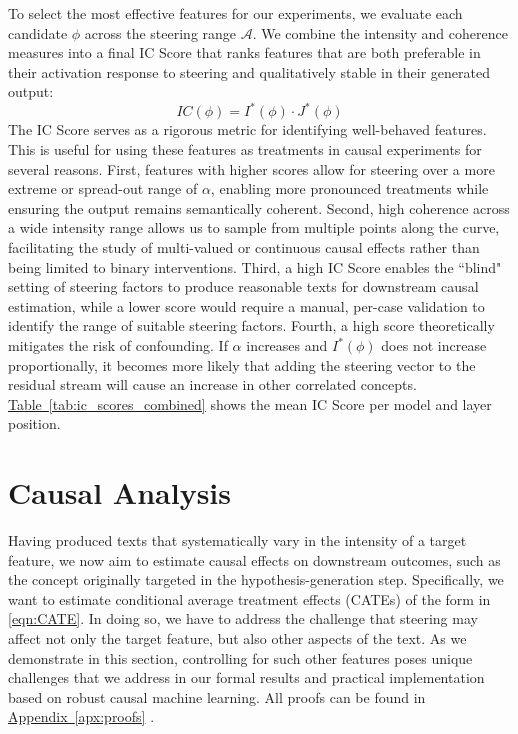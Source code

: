 \documentclass{article}
\theoremstyle{plain}
\theoremstyle{definition}
\theoremstyle{remark}
\newcommand{\myref}[2]{%
    \hyperref[#2]{#1~\ref*{#2}}%
}
\begin{document}
To select the most effective features for our experiments, we evaluate each candidate $\phi$ across the steering range $\mathcal{A}$. We combine the intensity and coherence measures into a final IC Score that ranks features that are both preferable in their activation response to steering and qualitatively stable in their generated output:
\begin{equation}
    IC(\phi) = I^*(\phi) \cdot J^*(\phi)
\end{equation}
The IC Score serves as a rigorous metric for identifying well-behaved features. This is useful for using these features as treatments in causal experiments for several reasons. First, features with higher scores allow for steering over a more extreme or spread-out range of $\alpha$, enabling more pronounced treatments while ensuring the output remains semantically coherent. Second, high coherence across a wide intensity range allows us to sample from multiple points along the curve, facilitating the study of multi-valued or continuous causal effects rather than being limited to binary interventions. Third, a high IC Score enables the ``blind" setting of steering factors to produce reasonable texts for downstream causal estimation, while a lower score would require a manual, per-case validation to identify the range of suitable steering factors. Fourth, a high score theoretically mitigates the risk of confounding. If $\alpha$ increases and $I^*(\phi)$ does not increase proportionally, it becomes more likely that adding the steering vector to the residual stream will cause an increase in other correlated concepts. \myref{Table}{tab:ic_scores_combined} shows the mean IC Score per model and layer position.



\section{Causal Analysis}

Having produced texts that systematically vary in the intensity of a target feature, we now aim to estimate causal effects on downstream outcomes, such as the concept originally targeted in the hypothesis-generation step.
Specifically, we want to estimate conditional average treatment effects (CATEs) of the form in \eqref{eqn:CATE}.
In doing so, we have to address the challenge that steering may affect not only the target feature, but also other aspects of the text.
As we demonstrate in this section, controlling for such other features poses unique challenges that we address in our formal results and practical implementation based on robust causal machine learning. All proofs can be found in \myref{Appendix}{apx:proofs}.
\end{document}
